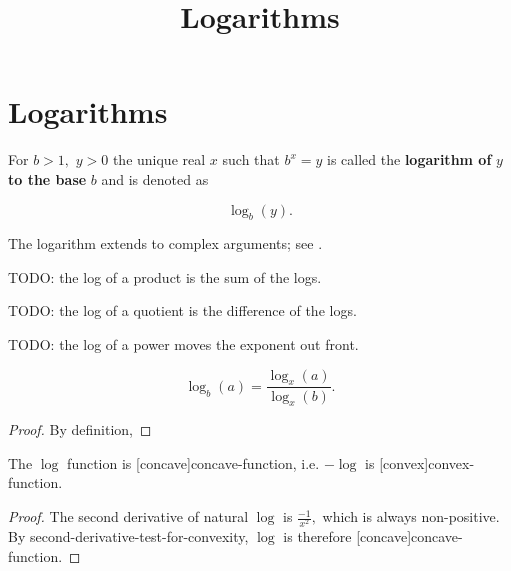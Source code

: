 \documentclass{article}
\title{Logarithms}
\begin{document}
\section{Logarithms}

\begin{definition}[Logarithm]
	For $b > 1,$ $y > 0$ the unique \@{real} $x$ such that $b^x = y$ is called the \textbf{logarithm of} $y$ \textbf{to the base} $b$ and is denoted as

\[ \log_b{(y)}. \]
\end{definition}

\begin{note}
The logarithm extends to complex arguments; see .
\end{note}

\begin{theorem}\label{product-rule-for-logarithms}
TODO: the log of a product is the sum of the logs.
\end{theorem}

\begin{theorem}
TODO: the log of a quotient is the difference of the logs.
\end{theorem}

\begin{theorem}
TODO: the log of a power moves the exponent out front.
\end{theorem}

\begin{theorem}\label{logarithm-change-of-base}
\[ \log_b{(a)} = \frac{\log_x{(a)}}{\log_x{(b)}}. \]
\end{theorem}

\begin{proof}
By definition,
\end{proof}


\begin{theorem}\label{log-is-concave}
The $\log$ \@{function} is \@[concave]{concave-function}, i.e. $-\log$ is \@[convex]{convex-function}.
\end{theorem}

\begin{proof}
The second derivative of natural $\log$ is $\frac{-1}{x^2},$ which is always non-positive. By \@{second-derivative-test-for-convexity}, $\log$ is therefore \@[concave]{concave-function}.
\end{proof}
\end{document}
